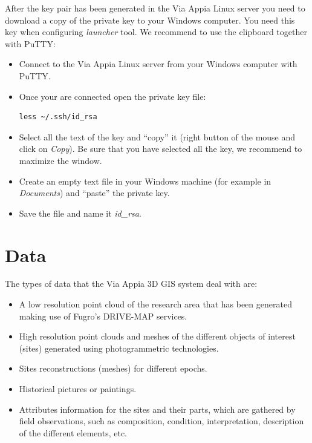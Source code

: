 \documentclass[a4paper,11pt]{article}
\begin{document}
After the key pair has been generated in the Via Appia Linux server you need to download a copy of the private key to your Windows computer. You need this key when configuring \textit{launcher} tool.  We recommend to use the clipboard together with PuTTY:
\begin{itemize}
\item Connect to the Via Appia Linux server from your Windows computer with PuTTY.
\item Once your are connected open the private key file:
\begin{Verbatim}[fontfamily=courier,commandchars=\\\{\},fontsize=\footnotesize]
less ~/.ssh/id_rsa
\end{Verbatim}
\item Select all the text of the key and ``copy'' it (right button of the mouse and click on \textit{Copy}). Be sure that you have selected all the key, we recommend to maximize the window.
\item Create an empty text file in your Windows machine (for example in \textit{Documents}) and ``paste'' the private key.
\item Save the file and name it \textit{id\_rsa}.
\end{itemize}

\section{Data}
\label{sec:data}

The types of data that the Via Appia 3D GIS system deal with are:

\begin{itemize}
\item A low resolution point cloud of the research area that has been generated making use of Fugro’s DRIVE-MAP services. 
\item High resolution point clouds and meshes of the different objects of interest (sites) generated using photogrammetric technologies. 
\item Sites reconstructions (meshes) for different epochs. 
\item Historical pictures or paintings. 
\item Attributes information for the sites and their parts, which are gathered by field observations, such as composition, condition, interpretation, description of the different elements, etc. 
\end{itemize}
\end{document}
